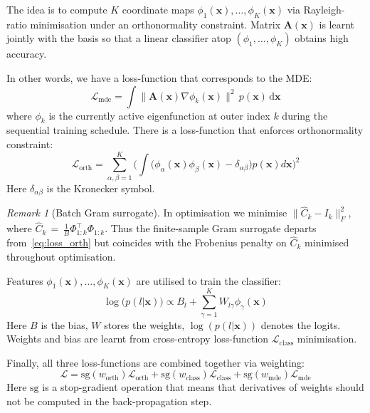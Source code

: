 \documentclass{article}
\theoremstyle{plain}
\theoremstyle{definition}
\theoremstyle{remark}
\newtheorem{remark}[theorem]{Remark}
\begin{document}
The idea is to compute $K$ coordinate maps $\phi_1(\mathbf{x}), \ldots, \phi_K(\mathbf{x})$ via Rayleigh-ratio minimisation under an orthonormality constraint.
Matrix $\mathbf{A}(\mathbf{x})$ is learnt jointly with the basis so that a linear classifier atop $(\phi_1,\ldots,\phi_K)$ obtains high accuracy.

In other words, we have a loss-function that corresponds to the MDE:
\begin{equation}
    \label{eq:loss_mde}
    \mathcal{L}_{\text{mde}} = \int \bigl\lVert \mathbf{A}(\mathbf{x}) \nabla \phi_k(\mathbf{x}) \bigr\rVert^2 \, p(\mathbf{x}) \,\mathrm{d}\mathbf{x}
\end{equation}
where $\phi_k$ is the currently active eigenfunction at outer index $k$ during the sequential training schedule.
There is a loss-function that enforces orthonormality constraint:
\begin{equation}
    \label{eq:loss_orth}
    \mathcal{L}_{\text{orth}} = \sum_{\alpha, \beta=1}^{K} \bigg(\int \big(\phi_{\alpha}(\mathbf{x}) \phi_{\beta}(\mathbf{x}) - \delta_{\alpha\beta}\big) p(\mathbf{x}) d\mathbf{x} \bigg)^2
\end{equation}
Here $\delta_{\alpha\beta}$ is the Kronecker symbol.

\begin{remark}[Batch Gram surrogate]
\label{remark:batch_gram}
In optimisation we minimise $\|\hat C_k-I_k\|_F^{2}$, where $\hat C_k\,{=}\,\frac{1}{B}\Phi_{1:k}^{\top}\Phi_{1:k}$.
Thus the finite-sample Gram surrogate departs from~\eqref{eq:loss_orth} but coincides with the Frobenius penalty on $\hat C_k$ minimised throughout optimisation.
\end{remark}

Features $\phi_1(\mathbf{x}), \ldots, \phi_K(\mathbf{x})$ are utilised to train the classifier:
\begin{equation}
    \label{eq:class_log_prob}
    \log\big(p(l|\mathbf{x})\big) \propto B_l + \sum_{\gamma=1}^{K} W_{l\gamma} \phi_{\gamma}(\mathbf{x})
\end{equation}
Here $B$ is the bias, $W$ stores the weights, $\log(p(l|\mathbf{x}))$ denotes the logits.
Weights and bias are learnt from cross-entropy loss-function $\mathcal{L}_{\text{class}}$ minimisation.
  
Finally, all three loss-functions are combined together via weighting:
\begin{equation}
    \label{eq:loss_function}
    \mathcal{L} = \text{sg}(w_{\text{orth}}) \mathcal{L}_{\text{orth}} + \text{sg}(w_{\text{class}}) \mathcal{L}_{\text{class}} + \text{sg}(w_{\text{mde}}) \mathcal{L}_{\text{mde}} 
\end{equation}
Here $\text{sg}$ is a stop-gradient operation that means that derivatives of weights should not be computed in 
the back-propagation step.
\end{document}
